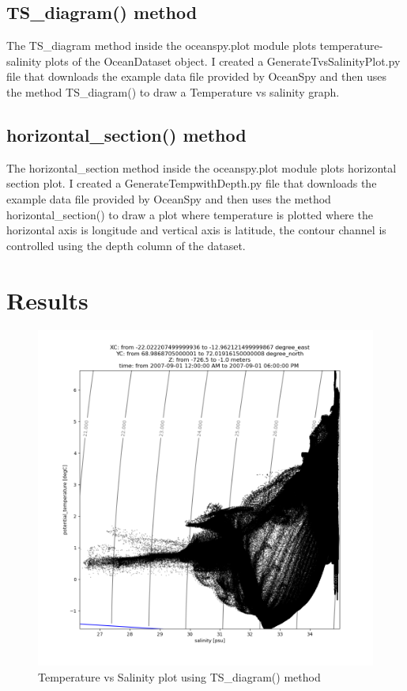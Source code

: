 \documentclass[12pt, letterpaper]{article}
\begin{document}
\subsection{TS\_diagram() method}
The TS\_diagram method inside the oceanspy.plot module plots temperature-salinity plots of the OceanDataset object. I created a GenerateTvsSalinityPlot.py file that downloads the example data file provided by OceanSpy and then uses the method TS\_diagram() to draw a Temperature vs salinity graph.  

\subsection{horizontal\_section() method}
The horizontal\_section method inside the oceanspy.plot module plots horizontal section plot. I created a GenerateTempwithDepth.py file that downloads the example data file provided by OceanSpy and then uses the method horizontal\_section() to draw a plot where temperature is plotted where the horizontal axis is longitude and vertical axis is latitude, the contour channel is controlled using the depth column of the dataset. 


\section{Results}
\begin{figure}
\includegraphics[width=1\textwidth]{TempvsSalinity}
\caption{Temperature vs Salinity plot using TS\_diagram() method}
\label{fig:TempvsSalinity}
\end{figure}
\end{document}

